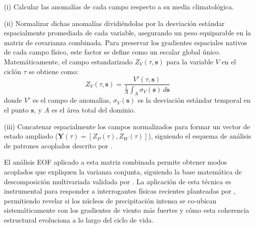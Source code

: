 (i) Calcular las anomalías de cada campo respecto a su media climatológica.

(ii) Normalizar dichas anomalías dividiéndolas por la desviación estándar espacialmente promediada de cada variable, asegurando un peso equiparable en la matriz de covarianza combinada. Para preservar los gradientes espaciales nativos de cada campo físico, este factor se define como un escalar global único. Matemáticamente, el campo estandarizado $Z_{V}(\tau, \mathbf{s})$ para la variable $V$ en el ciclón $\tau$ se obtiene como:
\begin{equation}
    Z_{V}(\tau, \mathbf{s}) = \frac{V'(\tau, \mathbf{s})}{\frac{1}{A}\int_{A} \sigma_{V}(\mathbf{s}) \, d\mathbf{s}}
\end{equation}
donde $V'$ es el campo de anomalías, $\sigma_{V}(\mathbf{s})$ es la desviación estándar temporal en el punto $\mathbf{s}$, y $A$ es el área total del dominio.

(iii) Concatenar espacialmente los campos normalizados para formar un vector de estado ampliado ($\mathbf{Y}(\tau) = [Z_P(\tau), Z_W(\tau)]$), siguiendo el esquema de análisis de patrones acoplados descrito por \citet{bretherton1992intercomparison}.

El análisis EOF aplicado a esta matriz combinada permite obtener modos acoplados que expliquen la varianza conjunta, siguiendo la base matemática de descomposición multivariada validada por \citet{liang2018multivariate}. La aplicación de esta técnica es instrumental para responder a interrogantes físicas recientes planteadas por \citet{sinclair2023relationship}, permitiendo revelar si los núcleos de precipitación intensa se co-ubican sistemáticamente con los gradientes de viento más fuertes y cómo esta coherencia estructural evoluciona a lo largo del ciclo de vida.

